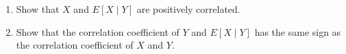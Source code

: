 \documentclass[paper=usletter, fontsize=12pt]{article}
\begin{document}
\begin{enumerate}
\begin{enumerate}
            \item Show that $X$ and $E[X\mid Y]$ are positively correlated.

            \item Show that the correlation coefficient of $Y$ and $E[X\mid Y]$
            has the same sign as the correlation coefficient of $X$ and $Y$.

        \end{enumerate}

    \end{enumerate}
\end{document}

